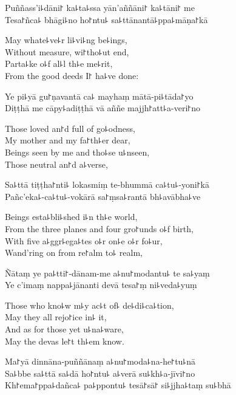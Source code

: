 Puññass'i꜕dāni꜓ ka꜕ta꜕ssa yān'aññāni꜓ ka꜕tāni꜓ me\\
Tesa꜓ñca꜕ bhāgi꜕no ho꜓ntu꜕ sa꜕ttānantā꜕ppa꜕māṇa꜓kā

\begin{english}
  May whate꜕ve꜕r li꜕vi꜕ng be꜕ings,\\
  Without measure, wi꜓tho꜕ut end,\\
  Parta꜕ke o꜕f al꜕l th꜕e me꜕rit,\\
  From the good deeds I꜓ ha꜕ve done:
\end{english}

Ye pi꜕yā gu꜓ṇavantā ca꜕ mayhaṃ mātā-pi꜕tāda꜓yo\\
Diṭṭhā me cāpy꜕adiṭṭhā vā aññe majjh꜓att꜕a-veri꜓no

\begin{english}
  Those loved an꜓d full of go꜕odness,\\
  My mother and my fa꜓th꜕er dear,\\
  Beings seen by me and tho꜕se u꜕nseen,\\
  Those neutral an꜓d a꜕verse,
\end{english}

Sa꜕ttā tiṭṭha꜓nti꜕ lokasmiṃ te-bhummā ca꜕tu꜕-yoni꜓kā\\
Pañc'eka꜕-ca꜕tu꜕-vokārā sa꜓ṃsa꜕rantā bh꜕avābha꜕ve

\begin{english}
  Beings esta꜕bli꜕shed i꜕n th꜕e world,\\
  From the three planes and four gro꜓unds o꜕f birth,\\
  With five a꜕ggr꜕ega꜕tes o꜕r on꜕e o꜕r fo꜕ur,\\
  Wand'ring on from re꜓alm to꜕ realm,
\end{english}

Ñātaṃ ye pa꜕tti꜓-dānam-me a꜕nu꜓modantu꜕ te sa꜕yaṃ\\
Ye c'imaṃ nappa꜕jānanti devā tesa꜓ṃ ni꜕veda꜕yuṃ

\begin{english}
  Those who kno꜕w m꜕y ac꜕t of꜕ de꜕di꜕ca꜕tion,\\
  May they all rejo꜓ice in꜕ it,\\
  And as for those yet u꜕na꜕ware,\\
  May the devas le꜓t th꜕em know.
\end{english}

Ma꜓yā dinnāna-puññānaṃ a꜕nu꜓moda꜕na-he꜓tu꜕nā\\
Sa꜕bbe sa꜕ttā sa꜕dā ho꜓ntu꜕ a꜕verā su꜕kh꜕a-jīvi꜓no\\
Kh꜓ema꜓ppa꜕dañca꜕ pa꜕ppontu꜕ tesā꜓sā꜓ si꜕jjha꜕taṃ su꜕bhā

